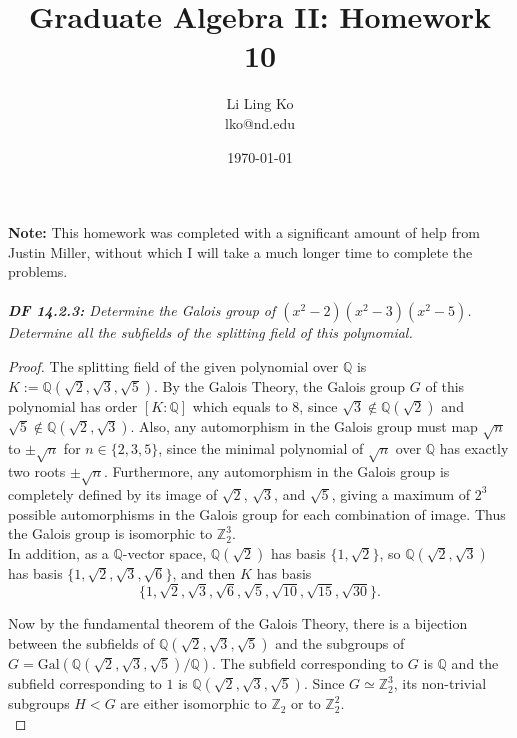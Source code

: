 \documentclass{article}
\begin{document}
\title{Graduate Algebra II: Homework 10}
\author{Li Ling Ko\\ lko@nd.edu}
\date{\today}
\maketitle

\textbf{Note:} This homework was completed with a significant amount of
  help from Justin Miller, without which I will take a much longer time to
  complete the problems. \\\\

\it \textbf{DF 14.2.3:} Determine the Galois group of
  $(x^2-2)(x^2-3)(x^2-5)$. Determine all the subfields of the splitting
  field of this polynomial.

  \begin{proof}
    The splitting field of the given polynomial over $\mathbb{Q}$ is
    $K:=\mathbb{Q}(\sqrt{2},\sqrt{3},\sqrt{5})$. By the Galois Theory, the
    Galois group $G$ of this polynomial has order
    $[K:\mathbb{Q}]$ which equals to
    8, since $\sqrt{3}\not\in\mathbb{Q}(\sqrt{2})$ and
    $\sqrt{5}\not\in\mathbb{Q}(\sqrt{2},\sqrt{3})$. Also, any automorphism
    in the Galois group must map $\sqrt{n}$ to $\pm\sqrt{n}$ for
    $n\in\{2,3,5\}$, since the minimal polynomial of $\sqrt{n}$ over
    $\mathbb{Q}$ has exactly two roots $\pm\sqrt{n}$. Furthermore, any
    automorphism in the Galois group is completely defined by its image of
    $\sqrt{2}$, $\sqrt{3}$, and $\sqrt{5}$, giving a maximum of $2^3$
    possible automorphisms in the Galois group for each combination of
    image. Thus the Galois group is isomorphic to $\mathbb{Z}_2^3$. \\

    In addition, as a $\mathbb{Q}$-vector space,
    $\mathbb{Q}(\sqrt{2})$ has basis $\{1,\sqrt{2}\}$, so
    $\mathbb{Q}(\sqrt{2},\sqrt{3})$ has basis
    $\{1,\sqrt{2},\sqrt{3},\sqrt{6}\}$, and then $K$ has basis
    \[\{1,\sqrt{2},\sqrt{3},\sqrt{6},
    \sqrt{5},\sqrt{10},\sqrt{15},\sqrt{30}\}.\]

    Now by the fundamental theorem of the Galois Theory, there is a bijection
    between the subfields of $\mathbb{Q}(\sqrt{2},\sqrt{3},\sqrt{5})$ and
    the subgroups of $G= \text{Gal}(\mathbb{Q}(\sqrt{2},\sqrt{3},\sqrt{5})
    /\mathbb{Q})$. The subfield corresponding to $G$ is $\mathbb{Q}$ and
    the subfield corresponding to $1$ is
    $\mathbb{Q}(\sqrt{2},\sqrt{3},\sqrt{5})$. Since
    $G\simeq\mathbb{Z}_2^3$, its non-trivial subgroups $H<G$ are either
    isomorphic to $\mathbb{Z}_2$ or to $\mathbb{Z}_2^2$. \\


\end{proof}
\end{document}
